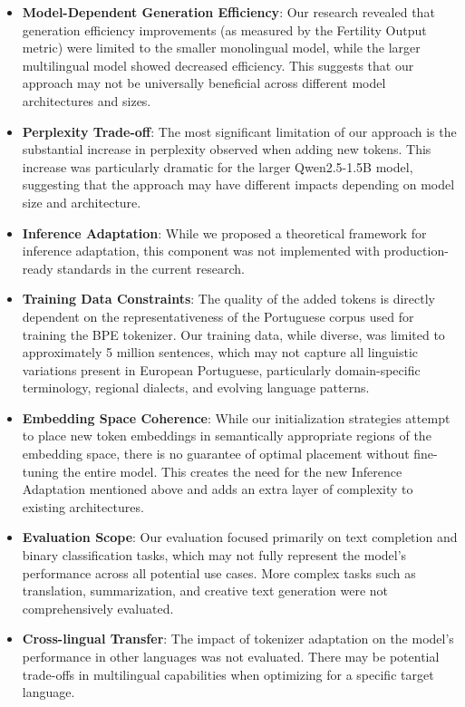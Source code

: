 \begin{itemize}
    \item \textbf{Model-Dependent Generation Efficiency}: Our research revealed that generation efficiency improvements (as measured by the Fertility Output metric) were limited to the smaller monolingual model, while the larger multilingual model showed decreased efficiency. This suggests that our approach may not be universally beneficial across different model architectures and sizes.
    
    \item \textbf{Perplexity Trade-off}: The most significant limitation of our approach is the substantial increase in perplexity observed when adding new tokens. This increase was particularly dramatic for the larger Qwen2.5-1.5B model, suggesting that the approach may have different impacts depending on model size and architecture.
    
    \item \textbf{Inference Adaptation}: While we proposed a theoretical framework for inference adaptation, this component was not implemented with production-ready standards in the current research.
    
    \item \textbf{Training Data Constraints}: The quality of the added tokens is directly dependent on the representativeness of the Portuguese corpus used for training the BPE tokenizer. Our training data, while diverse, was limited to approximately 5 million sentences, which may not capture all linguistic variations present in European Portuguese, particularly domain-specific terminology, regional dialects, and evolving language patterns.
    
    \item \textbf{Embedding Space Coherence}: While our initialization strategies attempt to place new token embeddings in semantically appropriate regions of the embedding space, there is no guarantee of optimal placement without fine-tuning the entire model. This creates the need for the new Inference Adaptation mentioned above and adds an extra layer of complexity to existing architectures.
    
    \item \textbf{Evaluation Scope}: Our evaluation focused primarily on text completion and binary classification tasks, which may not fully represent the model's performance across all potential use cases. More complex tasks such as translation, summarization, and creative text generation were not comprehensively evaluated.
    
    \item \textbf{Cross-lingual Transfer}: The impact of tokenizer adaptation on the model's performance in other languages was not evaluated. There may be potential trade-offs in multilingual capabilities when optimizing for a specific target language.
\end{itemize}

